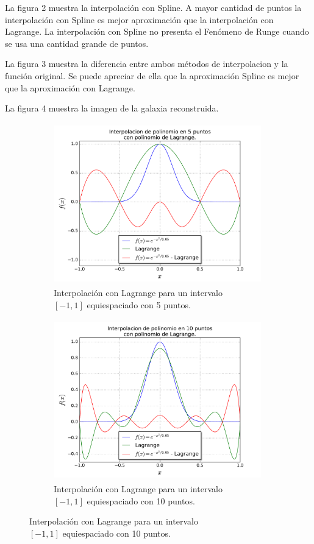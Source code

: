 \documentclass[a4paper, 11pt, spanish]{article}
\begin{document}
La figura 2 muestra la interpolaci\'on con Spline. A mayor cantidad de puntos la interpolaci\'on con Spline es mejor aproximaci\'on que la interpolaci\'on con Lagrange. La interpolaci\'on con Spline no presenta el Fen\'omeno de Runge cuando se usa una cantidad grande de puntos.

La figura 3 muestra la diferencia entre ambos m\'etodos de interpolacion y la funci\'on original. Se puede apreciar de ella que la aproximaci\'on Spline es mejor que la aproximaci\'on con Lagrange.

La figura 4 muestra la imagen de la galaxia reconstruida.
\begin{figure}[!hbpt]
\centering
\begin{subfigure}{.5\textwidth}
  \centering
  \includegraphics[width=9cm, height=7cm]{img/lagrange5.pdf}
  \caption{Interpolaci\'on con Lagrange para un intervalo\\ $[-1,1]$ equiespaciado con 5 puntos.}
\end{subfigure}%
\begin{subfigure}{.5\textwidth}
  \centering
  \includegraphics[width=9cm, height=7cm]{img/lagrange10.pdf}
  \caption{Interpolaci\'on con Lagrange para un intervalo\\ $[-1,1]$ equiespaciado con 10 puntos.}

\end{subfigure}
\end{figure}
\end{document}
